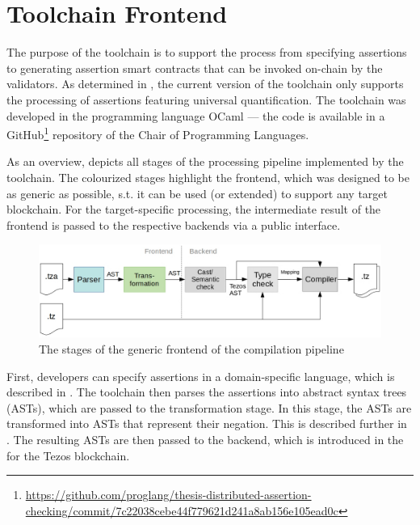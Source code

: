 \chapter{Toolchain Frontend}\label{chap:offline}
The purpose of the toolchain is to support the process from specifying assertions to generating assertion smart contracts that can be invoked on-chain by the validators. As determined in , the current version of the toolchain only supports the processing of assertions featuring universal quantification. The toolchain was developed in the programming language OCaml \cite{ocaml_docs} --- the code is available in a GitHub\footnote{\url{https://github.com/proglang/thesis-distributed-assertion-checking/commit/7c22038cebe44f779621d241a8ab156e105ead0c}} repository of the Chair of Programming Languages.

As an overview,  depicts all stages of the processing pipeline implemented by the toolchain. The colourized stages highlight the frontend, which was designed to be as generic as possible, s.t. it can be used (or extended) to support any target blockchain. For the target-specific processing, the intermediate result of the frontend is passed to the respective backends via a public interface.

\begin{figure}[h]
\includegraphics[width=\linewidth]{figures/3-offline/pipeline_frontend}
\caption{The stages of the generic frontend of the compilation pipeline}
\label{fig:pipeline_frontend}
\end{figure}

First, developers can specify assertions in a domain-specific language, which is described in . The toolchain then parses the assertions into abstract syntax trees (ASTs), which are passed to the transformation stage. In this stage, the ASTs are transformed into ASTs that represent their negation. This is described further in . The resulting ASTs are then passed to the backend, which is introduced in the  for the Tezos blockchain.

